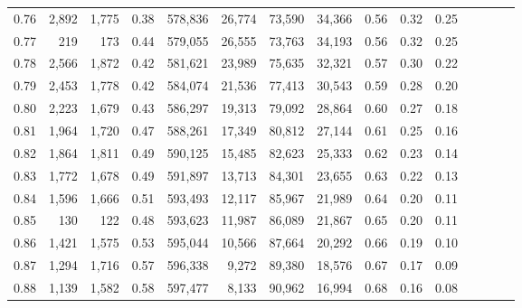 \begin{tabular}{rrrcrrrrrrrrrrr}
0.76 &   2,892 &  1,775 &                                       0.38 &  578,836 &   26,774 &   73,590 &   34,366 &  0.56 &  0.32 &                         0.25 \\
0.77 &     219 &    173 &                                       0.44 &  579,055 &   26,555 &   73,763 &   34,193 &  0.56 &  0.32 &                         0.25 \\
0.78 &   2,566 &  1,872 &                                       0.42 &  581,621 &   23,989 &   75,635 &   32,321 &  0.57 &  0.30 &                         0.22 \\
0.79 &   2,453 &  1,778 &                                       0.42 &  584,074 &   21,536 &   77,413 &   30,543 &  0.59 &  0.28 &                         0.20 \\
0.80 &   2,223 &  1,679 &                                       0.43 &  586,297 &   19,313 &   79,092 &   28,864 &  0.60 &  0.27 &                         0.18 \\
0.81 &   1,964 &  1,720 &                                       0.47 &  588,261 &   17,349 &   80,812 &   27,144 &  0.61 &  0.25 &                         0.16 \\
0.82 &   1,864 &  1,811 &                                       0.49 &  590,125 &   15,485 &   82,623 &   25,333 &  0.62 &  0.23 &                         0.14 \\
0.83 &   1,772 &  1,678 &                                       0.49 &  591,897 &   13,713 &   84,301 &   23,655 &  0.63 &  0.22 &                         0.13 \\
0.84 &   1,596 &  1,666 &                                       0.51 &  593,493 &   12,117 &   85,967 &   21,989 &  0.64 &  0.20 &                         0.11 \\
0.85 &     130 &    122 &                                       0.48 &  593,623 &   11,987 &   86,089 &   21,867 &  0.65 &  0.20 &                         0.11 \\
0.86 &   1,421 &  1,575 &                                       0.53 &  595,044 &   10,566 &   87,664 &   20,292 &  0.66 &  0.19 &                         0.10 \\
0.87 &   1,294 &  1,716 &                                       0.57 &  596,338 &    9,272 &   89,380 &   18,576 &  0.67 &  0.17 &                         0.09 \\
0.88 &   1,139 &  1,582 &                                       0.58 &  597,477 &    8,133 &   90,962 &   16,994 &  0.68 &  0.16 &                         0.08 \\

\end{tabular}
